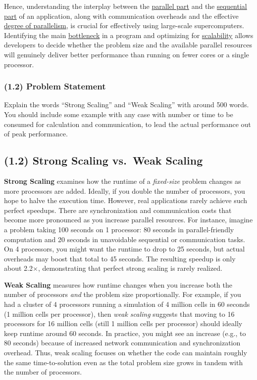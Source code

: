 \documentclass[11pt]{article}
\begin{document}
Hence, understanding the interplay between the \underline{parallel part} and the \underline{sequential part} of an application, along with communication overheads and the effective \underline{degree of parallelism}, is crucial for effectively using large-scale supercomputers. Identifying the main \underline{bottleneck} in a program and optimizing for \underline{scalability} allows developers to decide whether the problem size and the available parallel resources will genuinely deliver better performance than running on fewer cores or a single processor.

\bigskip

\subsubsection*{(1.2) Problem Statement}
Explain the words “Strong Scaling” and “Weak Scaling” with around 500 words.
You should include some example with any case with number or time to be consumed for calculation and communication, to lead the actual performance out of peak performance.

\subsection*{(1.2) Strong Scaling vs.\ Weak Scaling}

\textbf{Strong Scaling} examines how the runtime of a \emph{fixed-size} problem changes as more processors are added. Ideally, if you double the number of processors, you hope to halve the execution time. However, real applications rarely achieve such perfect speedups. There are synchronization and communication costs that become more pronounced as you increase parallel resources. For instance, imagine a problem taking 100 seconds on 1 processor: 80 seconds in parallel-friendly computation and 20 seconds in unavoidable sequential or communication tasks. On 4 processors, you might want the runtime to drop to 25 seconds, but actual overheads may boost that total to 45 seconds. The resulting speedup is only about 2.2$\times$, demonstrating that perfect strong scaling is rarely realized.

\textbf{Weak Scaling} measures how runtime changes when you increase both the number of processors \emph{and} the problem size proportionally. For example, if you had a cluster of 4 processors running a simulation of 4 million cells in 60 seconds (1 million cells per processor), then \emph{weak scaling} suggests that moving to 16 processors for 16 million cells (still 1 million cells per processor) should ideally keep runtime around 60 seconds. In practice, you might see an increase (e.g., to 80 seconds) because of increased network communication and synchronization overhead. Thus, weak scaling focuses on whether the code can maintain roughly the same time-to-solution even as the total problem size grows in tandem with the number of processors.
\end{document}
